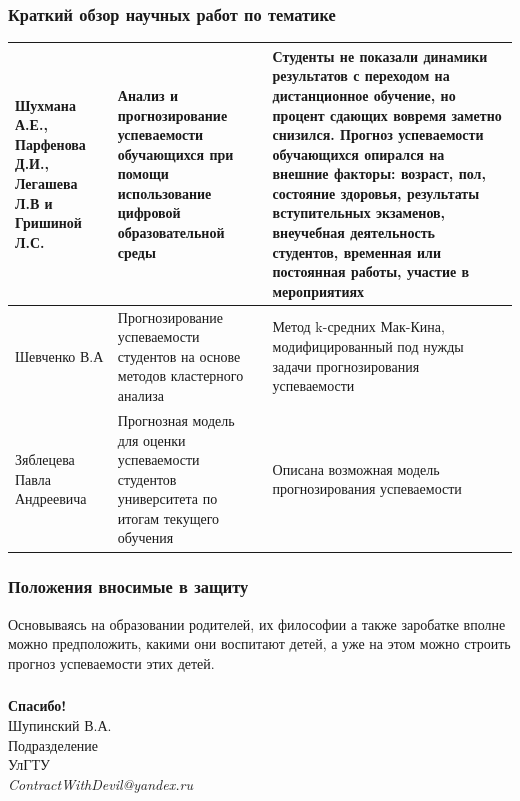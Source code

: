 \documentclass[
	fullscreen=true, 
	bookmarks=false,
	sans serif,
	9pt,
	pdf,
	hyperref={
		pdfpagelabels=false,
		unicode=true
	}
]{beamer}
\begin{document}
	\begin{frame}\frametitle{Краткий обзор научных работ по тематике}
		\begin{tabular}{|p{2cm}|p{3.3cm}|p{5.3cm}|}
			\hline 
			Шухмана А.Е., Парфенова Д.И., Легашева Л.В и Гришиной Л.С. & Анализ и прогнозирование успеваемости обучающихся при помощи использование цифровой образовательной среды  & Студенты не показали динамики результатов с переходом на дистанционное обучение, но процент сдающих вовремя заметно снизился. Прогноз успеваемости обучающихся опирался на внешние факторы: возраст, пол, состояние здоровья, результаты вступительных экзаменов, внеучебная деятельность студентов, временная или постоянная работы, участие в мероприятиях \\ 
			\hline 
			Шевченко В.А & Прогнозирование успеваемости студентов на основе методов кластерного анализа & Метод k-средних Мак-Кина, модифицированный под нужды задачи прогнозирования успеваемости \\ 
			\hline 
			Зяблецева Павла Андреевича & Прогнозная модель для оценки успеваемости студентов университета по итогам текущего обучения & Описана возможная модель прогнозирования успеваемости \\ 
			\hline 
		\end{tabular}		
	\end{frame}
	
	\begin{frame}\frametitle{Положения вносимые в защиту}
		Основываясь на образовании родителей, их философии а также заробатке вполне можно предположить, какими они воспитают детей, а уже на этом можно строить прогноз успеваемости этих детей.
	\end{frame}

	\begin{frame}\frametitle{}
		\Large
		\center
		\textbf{Спасибо!}\\
		\vspace{1.5cm}
		\normalsize
		Шупинский В.А.\\
		Подразделение\\
		УлГТУ\\
		\vspace{0.5cm}
		\textit{ContractWithDevil@yandex.ru}
	\end{frame}
	
\end{document}
